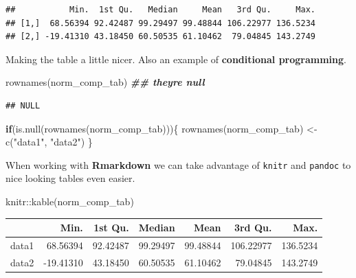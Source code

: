 \documentclass[
]{book}
\newenvironment{Shaded}{\begin{snugshade}}{\end{snugshade}}
\newcommand{\ControlFlowTok}[1]{\textcolor[rgb]{0.13,0.29,0.53}{\textbf{#1}}}
\newcommand{\DocumentationTok}[1]{\textcolor[rgb]{0.56,0.35,0.01}{\textbf{\textit{#1}}}}
\newcommand{\FunctionTok}[1]{\textcolor[rgb]{0.00,0.00,0.00}{#1}}
\newcommand{\NormalTok}[1]{#1}
\newcommand{\OtherTok}[1]{\textcolor[rgb]{0.56,0.35,0.01}{#1}}
\newcommand{\SpecialCharTok}[1]{\textcolor[rgb]{0.00,0.00,0.00}{#1}}
\newcommand{\StringTok}[1]{\textcolor[rgb]{0.31,0.60,0.02}{#1}}
\begin{document}
\begin{verbatim}
##           Min.  1st Qu.   Median     Mean   3rd Qu.     Max.
## [1,]  68.56394 92.42487 99.29497 99.48844 106.22977 136.5234
## [2,] -19.41310 43.18450 60.50535 61.10462  79.04845 143.2749
\end{verbatim}

Making the table a little nicer. Also an example of \textbf{conditional programming}.

\begin{Shaded}
\begin{Highlighting}[]
\FunctionTok{rownames}\NormalTok{(norm\_comp\_tab) }\DocumentationTok{\#\# they\textquotesingle{}re null}
\end{Highlighting}
\end{Shaded}

\begin{verbatim}
## NULL
\end{verbatim}

\begin{Shaded}
\begin{Highlighting}[]
\ControlFlowTok{if}\NormalTok{(}\FunctionTok{is.null}\NormalTok{(}\FunctionTok{rownames}\NormalTok{(norm\_comp\_tab)))\{}
  \FunctionTok{rownames}\NormalTok{(norm\_comp\_tab) }\OtherTok{\textless{}{-}} \FunctionTok{c}\NormalTok{(}\StringTok{"data1"}\NormalTok{, }\StringTok{"data2"}\NormalTok{)}
\NormalTok{\}}
\end{Highlighting}
\end{Shaded}

When working with \textbf{Rmarkdown} we can take advantage of \texttt{knitr} and \texttt{pandoc} to nice looking tables even easier.

\begin{Shaded}
\begin{Highlighting}[]
\NormalTok{knitr}\SpecialCharTok{::}\FunctionTok{kable}\NormalTok{(norm\_comp\_tab)}
\end{Highlighting}
\end{Shaded}

\begin{tabular}{l|r|r|r|r|r|r}
\hline
  & Min. & 1st Qu. & Median & Mean & 3rd Qu. & Max.\\
\hline
data1 & 68.56394 & 92.42487 & 99.29497 & 99.48844 & 106.22977 & 136.5234\\
\hline
data2 & -19.41310 & 43.18450 & 60.50535 & 61.10462 & 79.04845 & 143.2749\\
\hline
\end{tabular}
\end{document}
